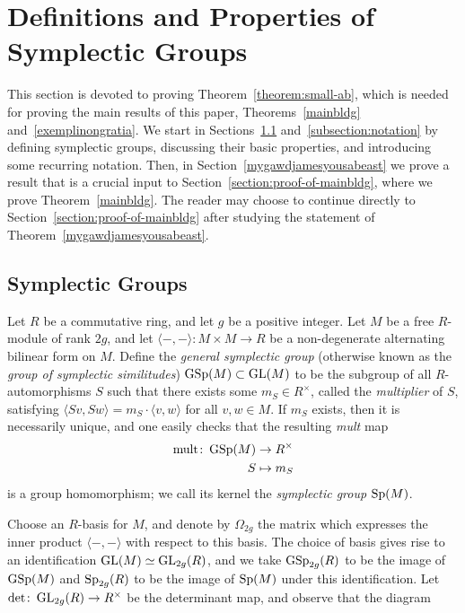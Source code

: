 \section{Definitions and Properties of Symplectic Groups}
\label{section:group-theory}

This section is devoted to proving Theorem~\ref{theorem:small-ab},
which is needed for proving the main results of this paper, Theorems~\ref{mainbldg} and~\ref{exemplinongratia}. We start in Sections~\ref{subsection:stimpy} and~\ref{subsection:notation} by defining symplectic groups, discussing their basic properties, and introducing some recurring notation. Then, in Section~\ref{mygawdjamesyousabeast} we prove a result that is a crucial input to Section~\ref{section:proof-of-mainbldg}, where we prove Theorem~\ref{mainbldg}.
The reader may choose to continue directly to Section~\ref{section:proof-of-mainbldg} after studying the statement of Theorem~\ref{mygawdjamesyousabeast}.

\subsection{Symplectic Groups}\label{subsection:stimpy}

Let $R$ be a commutative ring, and let $g$ be a positive integer. Let $M$ be a free $R$-module of rank $2g$, and let $\langle -, - \rangle \colon M \times M \to R$ be a non-degenerate alternating bilinear form on $M$. Define the {\it general symplectic group} (otherwise known as the \emph{group of symplectic similitudes}) $\operatorname{GSp}(M) \subset \operatorname{GL}(M)$ to be the subgroup of all $R$-automorphisms $S$ such that there exists some $m_S \in R^\times$, called the {\it multiplier} of $S$, satisfying $\langle S v, Sw \rangle = m_S \cdot \langle v, w \rangle$ for all $v, w \in M$. If $m_S$ exists, then it is necessarily unique, and one easily checks that the resulting {\it mult} map 
\begin{align*}
	\operatorname{mult} \colon \operatorname{GSp}(M) & \rightarrow R^\times \\
	S & \mapsto m_S
\end{align*}
is a group homomorphism; we call its kernel the {\it symplectic group} $\operatorname{Sp}(M)$.

Choose an $R$-basis for $M$, and denote by $\Omega_{2g}$ the matrix which expresses the inner product $\langle - , - \rangle$ with respect to this basis.
The choice of basis gives rise to an identification $\operatorname{GL}(M) \simeq \operatorname{GL}_{2g}(R)$, and we take $\operatorname{GSp}_{2g}(R)$ to be the image of $\operatorname{GSp}(M)$ and $\operatorname{Sp}_{2g}(R)$ to be the image of $\operatorname{Sp}(M)$ under this identification. Let $\det \colon \operatorname{GL}_{2g}(R) \to R^\times$ be the determinant map, and observe that the diagram
\begin{center}
\end{center}


